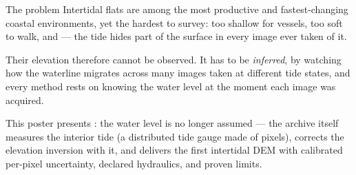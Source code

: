 \begin{pblock}{The problem}
Intertidal flats are among the most productive and fastest-changing
coastal environments, yet the hardest to survey: too shallow for vessels,
too soft to walk, and  —
the tide hides part of the surface in every image ever taken of it.

Their elevation therefore cannot be observed. It has to be \emph{inferred},
by watching how the waterline migrates across many images taken at different
tide states, and every method rests on knowing the water level at the moment
each image was acquired.

\vspace{3mm}
\begin{pcallout}
This poster presents : the water level is no longer assumed
--- the archive itself measures the interior tide (a distributed tide
gauge made of pixels), corrects the elevation inversion with it, and
delivers the first intertidal DEM with calibrated per-pixel uncertainty,
declared hydraulics, and proven limits.
\end{pcallout}
\end{pblock}
